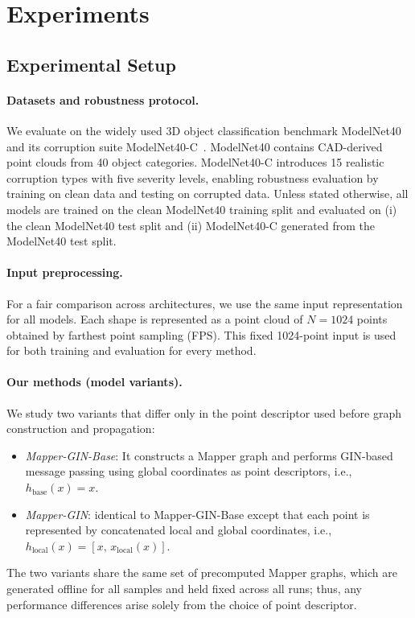 \documentclass{article}
\begin{document}
\section{Experiments}
\subsection{Experimental Setup}\label{sec:experimental_setup}
\paragraph{Datasets and robustness protocol.}
We evaluate on the widely used 3D object classification benchmark ModelNet40~\cite{wu20153d} and its corruption suite ModelNet40-C~\cite{modelnetbench2022}.
ModelNet40 contains CAD-derived point clouds from 40 object categories.
ModelNet40-C introduces 15 realistic corruption types with five severity levels, enabling robustness evaluation by training on clean data and testing on corrupted data.
Unless stated otherwise, all models are trained on the clean ModelNet40 training split and evaluated on (i) the clean ModelNet40 test split and (ii) ModelNet40-C generated from the ModelNet40 test split.

\paragraph{Input preprocessing.}
For a fair comparison across architectures, we use the same input representation for all models.
Each shape is represented as a point cloud of $N=1024$ points obtained by farthest point sampling (FPS).
This fixed 1024-point input is used for both training and evaluation for every method.

\paragraph{Our methods (model variants).}
We study two variants that differ only in the point descriptor used before graph construction and propagation:
\begin{itemize}\itemsep1pt
\item \emph{Mapper-GIN-Base}: It constructs a Mapper graph and performs GIN-based message passing using global coordinates as point descriptors, i.e., $h_{\text{base}}(x)=x$.
\item \emph{Mapper-GIN}: identical to Mapper-GIN-Base except that each point is represented by concatenated local and global coordinates, i.e., $h_{\text{local}}(x)=[x,\,x_{\mathrm{local}}(x)]$.
\end{itemize}
The two variants share the same set of precomputed Mapper graphs, which are generated offline for all samples and held fixed across all runs; thus, any performance differences arise solely from the choice of point descriptor.
\end{document}
